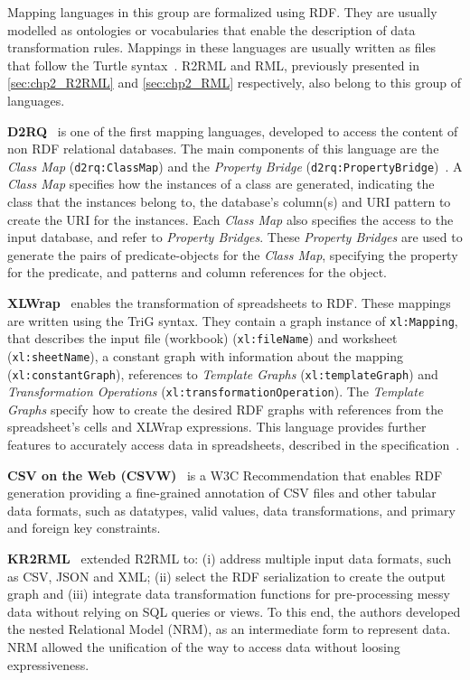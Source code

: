 Mapping languages in this group are formalized using RDF. They are usually modelled as ontologies or vocabularies that enable the description of data transformation rules. Mappings in these languages are usually written as files that follow the Turtle syntax~\parencite{turtle}. R2RML and RML, previously presented in \cref{sec:chp2_R2RML}
and \cref{sec:chp2_RML} respectively, also belong to this group of languages. 


\noindent\textbf{D2RQ}~\parencite{bizer2004d2rq} is one of the first mapping languages, developed to access the content of non RDF relational databases. The main components of this language are the \textit{Class Map} (\texttt{d2rq:ClassMap}) and the \textit{Property Bridge} (\texttt{d2rq:PropertyBridge})~\parencite{d2rq}. A \textit{Class Map} specifies how the instances of a class are generated, indicating the class that the instances belong to, the database's column(s) and URI pattern to create the URI for the instances. Each \textit{Class Map} also specifies the access to the input database, and refer to \textit{Property Bridges}. These \textit{Property Bridges} are used to generate the pairs of predicate-objects for the \textit{Class Map}, specifying the property for the predicate, and patterns and column references for the object. 


\noindent\textbf{XLWrap}~\parencite{langegger2009xlwrap} enables the transformation of spreadsheets to RDF. These mappings are written using the TriG syntax. They contain a graph instance of \texttt{xl:Mapping}, that describes the input file (workbook) (\texttt{xl:fileName}) and worksheet (\texttt{xl:sheetName}), a constant graph with information about the mapping (\texttt{xl:constantGraph}), references to \textit{Template Graphs} (\texttt{xl:templateGraph}) and \textit{Transformation Operations} (\texttt{xl:transformationOperation}). The \textit{Template Graphs} specify how to create the desired RDF graphs with references from the spreadsheet's cells and XLWrap expressions. This language provides further features to accurately access data in spreadsheets, described in the specification~\parencite{xlwrap}.  

\noindent\textbf{CSV on the Web (CSVW)}~\parencite{Tennison2015csvw} is a W3C Recommendation that enables RDF generation providing a fine-grained annotation of CSV files and other tabular data formats, such as datatypes, valid values, data transformations, and primary and foreign key constraints. 

\noindent\textbf{KR2RML}~\parencite{slepicka2015kr2rml} extended R2RML to: (i) address multiple input data formats, such as CSV, JSON and XML; (ii) select the RDF serialization to create the output graph and (iii) integrate data transformation functions for pre-processing messy data without relying on SQL queries or views. To this end, the authors developed the nested Relational Model (NRM), as an intermediate form to represent data. NRM allowed the unification of the way to access data without loosing expressiveness. 

